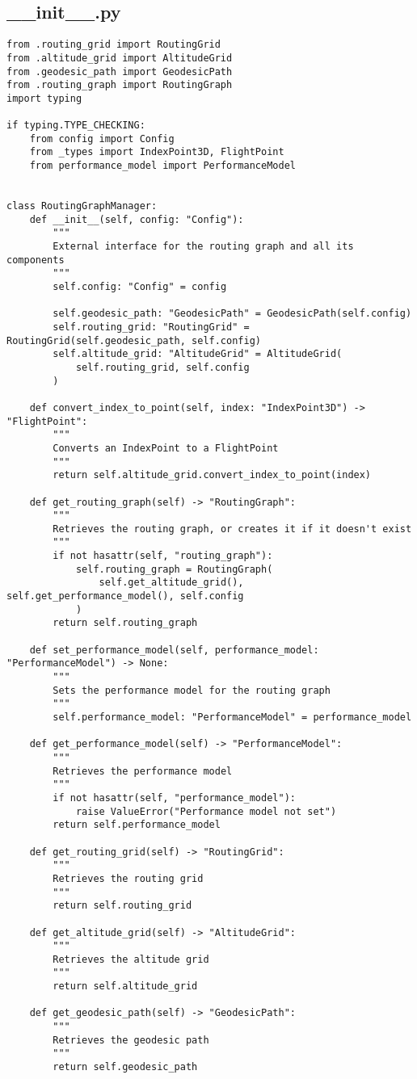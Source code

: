 \subsection{__init__.py}
\begin{verbatim}
from .routing_grid import RoutingGrid
from .altitude_grid import AltitudeGrid
from .geodesic_path import GeodesicPath
from .routing_graph import RoutingGraph
import typing

if typing.TYPE_CHECKING:
    from config import Config
    from _types import IndexPoint3D, FlightPoint
    from performance_model import PerformanceModel


class RoutingGraphManager:
    def __init__(self, config: "Config"):
        """
        External interface for the routing graph and all its components
        """
        self.config: "Config" = config

        self.geodesic_path: "GeodesicPath" = GeodesicPath(self.config)
        self.routing_grid: "RoutingGrid" = RoutingGrid(self.geodesic_path, self.config)
        self.altitude_grid: "AltitudeGrid" = AltitudeGrid(
            self.routing_grid, self.config
        )

    def convert_index_to_point(self, index: "IndexPoint3D") -> "FlightPoint":
        """
        Converts an IndexPoint to a FlightPoint
        """
        return self.altitude_grid.convert_index_to_point(index)

    def get_routing_graph(self) -> "RoutingGraph":
        """
        Retrieves the routing graph, or creates it if it doesn't exist
        """
        if not hasattr(self, "routing_graph"):
            self.routing_graph = RoutingGraph(
                self.get_altitude_grid(), self.get_performance_model(), self.config
            )
        return self.routing_graph

    def set_performance_model(self, performance_model: "PerformanceModel") -> None:
        """
        Sets the performance model for the routing graph
        """
        self.performance_model: "PerformanceModel" = performance_model

    def get_performance_model(self) -> "PerformanceModel":
        """
        Retrieves the performance model
        """
        if not hasattr(self, "performance_model"):
            raise ValueError("Performance model not set")
        return self.performance_model

    def get_routing_grid(self) -> "RoutingGrid":
        """
        Retrieves the routing grid
        """
        return self.routing_grid

    def get_altitude_grid(self) -> "AltitudeGrid":
        """
        Retrieves the altitude grid
        """
        return self.altitude_grid

    def get_geodesic_path(self) -> "GeodesicPath":
        """
        Retrieves the geodesic path
        """
        return self.geodesic_path

\end{verbatim}
